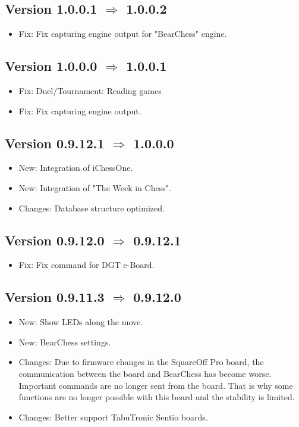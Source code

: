 \documentclass[11pt,a4paper]{article}
\begin{document}
\subsection*{Version 1.0.0.1 $\Rightarrow$  1.0.0.2}
\begin{itemize}		
	\item {\color{red}Fix}: Fix capturing engine output for "BearChess" engine.
\end{itemize}

\subsection*{Version 1.0.0.0 $\Rightarrow$  1.0.0.1}
\begin{itemize}	
	\item {\color{red}Fix}: Duel/Tournament: Reading games
	\item {\color{red}Fix}: Fix capturing engine output.
\end{itemize}

\subsection*{Version 0.9.12.1 $\Rightarrow$  1.0.0.0}
\begin{itemize}	
	\item {\color{blue}New}: Integration of iChessOne.
	\item {\color{blue}New}: Integration of "The Week in Chess".
	\item {\color{teal}Changes}: Database structure optimized.
\end{itemize}

\subsection*{Version 0.9.12.0 $\Rightarrow$  0.9.12.1}
\begin{itemize}	
	\item {\color{red}Fix}: Fix command for DGT e-Board.
\end{itemize}

\subsection*{Version 0.9.11.3 $\Rightarrow$  0.9.12.0}
\begin{itemize}	
	\item {\color{blue}New}: Show LEDs along the move.
	\item {\color{blue}New}: BearChess settings.
	\item {\color{teal}Changes}: Due to firmware changes in the SquareOff Pro board, the communication between the board and BearChess has become worse. Important commands are no longer sent from the board. That is why some functions are no longer possible with this board and the stability is limited.
	\item {\color{teal}Changes}: Better support TabuTronic Sentio boards.
\end{itemize}
\end{document}
